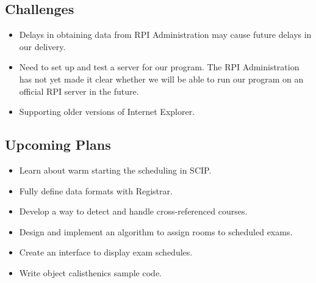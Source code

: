 \documentclass[11pt]{article}
\begin{document}
\subsection{Challenges}
\begin{itemize}
	\item Delays in obtaining data from RPI Administration may cause future delays in our delivery.
	\item Need to set up and test a server for our program. The RPI Administration has not yet made it clear whether we will be able to run our program on an official RPI server in the future.
	\item Supporting older versions of Internet Explorer.
\end{itemize}

\subsection{Upcoming Plans}
\begin{itemize}
	\item Learn about warm starting the scheduling in SCIP.
	\item Fully define data formats with Registrar.
	\item Develop a way to detect and handle cross-referenced courses.
	\item Design and implement an algorithm to assign rooms to scheduled exams.
	\item Create an interface to display exam schedules. 
	\item Write object calisthenics sample code.
\end{itemize}
\end{document}
